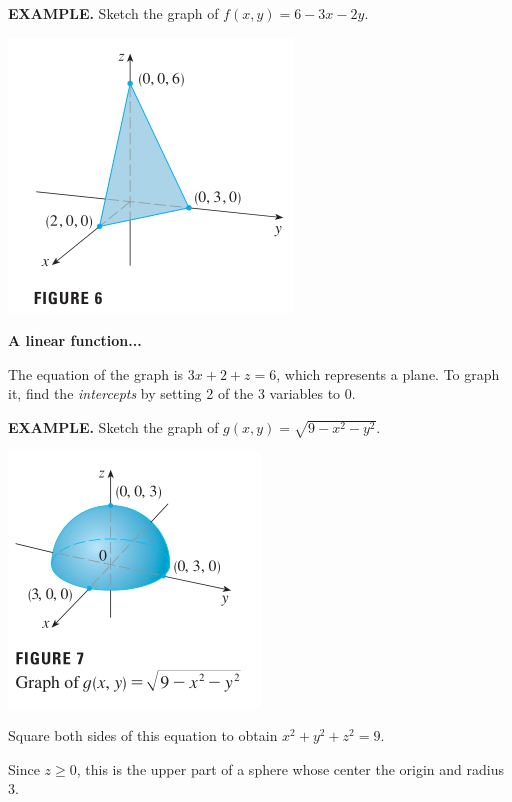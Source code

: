 \documentclass{article}
\begin{document}
{\selectfont \textbf{\textcolor{blue5}{EXAMPLE.}}} Sketch the graph of $f(x,y) = 6 - 3x - 2y$.

\begin{minipage}[]{0.3\linewidth}
  \includegraphics[width = 4 cm]{./images/eg5.png}
  
\end{minipage}
\begin{minipage}[]{0.6\linewidth}
  {\selectfont \textbf{\textcolor{blue5}{A linear function...}}} 

  The equation of the graph is $3x + 2 + z = 6$, which represents a plane. To graph it, find the \textit{intercepts} by setting 2 of the 3 variables to 0.
\end{minipage}

{\selectfont \textbf{\textcolor{blue5}{EXAMPLE.}}} Sketch the graph of $g(x,y) = \sqrt{9 - x^2 - y^2}$.

\begin{minipage}[]{0.34\linewidth}
  \includegraphics[width = 4 cm]{./images/eg6.png}
  
\end{minipage}
\begin{minipage}[]{0.6\linewidth}
  Square both sides of this equation to obtain $x^2 + y^2 + z^2 = 9$.

  Since $z \ge 0$, this is the upper part of a sphere whose center the origin and radius 3.
\end{minipage}
\end{document}
